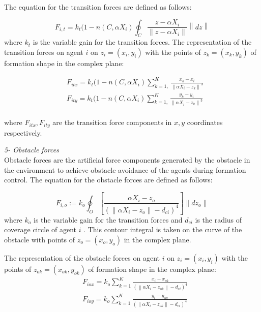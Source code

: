 \documentclass[twoside]{article}
\newcommand{\norm}[1]{\left\lVert#1\right\rVert}
\begin{document}
			
				The equation for the transition forces are defined as follows:	
				
				\begin{equation}
 F_{i,t} = k_t (1-n(C,\alpha X_i) \oint_C \frac{z-\alpha X_i}{\norm{z-\alpha X_i}}\norm{dz}
				\end{equation}
				where $k_t$ is the variable gain for the transition forces. The representation of the transition forces on agent $i$ on $z_i = (x_i, y_i)$ with the points of  $z_k = (x_k,y_k)$ of formation shape in the complex plane:
			
\begin{align*}
&F_{itx} = k_t  (1-n(C,\alpha X_i) \sum_{k=1,}^{K}\frac{x_k- x_i}{\norm{\alpha X_i - z_k}^3}\\
&F_{ity} = k_t  (1-n(C,\alpha X_i) \sum_{k=1,}^{K}\frac{y_k- y_i}{\norm{\alpha X_i - z_k}^3}\\
\end{align*}
			
			where  $F_{itx} , F_{ity} $ are the transition force components in $x,y$ coordinates respectively. \newline
			
					\textit{			5- Obstacle forces} \\ 

			
			Obstacle forces are the artificial force components generated by the obstacle in the environment to achieve obstacle avoidance of the agents during formation control. 	
			The equation for the obstacle forces are defined as follows:	
			
			\begin{equation}
F_{i,o} := k_o  \oint_O \left[\frac{\alpha X_i - z_o}{(\norm{\alpha X_i - z_o} - d_{ci})^4}\right] \norm{dz_o}
			\end{equation}
			where $k_o$ is the variable gain for the transition forces and $d_{ci}$ is the radius of coverage circle of agent $i$ . This contour integral is taken on the curve of the obstacle with  points of $z_o = (x_o,y_o)$ in the complex plane.
			
			The representation of the obstacle forces on agent $i$ on $z_i = (x_i, y_i)$ with the points of  $z_{ok} = (x_{ok},y_{ok})$ of formation shape in the complex plane:
			\begin{align*}
			& F_{iox} = k_o   \sum_{k=1}^{K} \frac{x_i -x_{ok}}{(\norm{\alpha X_i - z_{ok}} -d_{ci})^4}\\
			& F_{ioy} = k_o   \sum_{k=1}^{K} \frac{y_i - y_{ok}}{(\norm{\alpha X_i - z_{ok}} -d_{ci})^4}\\
			\end{align*}
			
\end{document}

